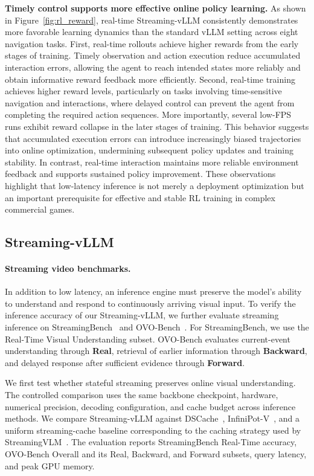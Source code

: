 \textbf{Timely control supports more effective online policy learning.}
As shown in Figure~\ref{fig:rl_reward}, real-time Streaming-vLLM consistently demonstrates more favorable learning dynamics than the standard vLLM setting across eight navigation tasks. First, real-time rollouts achieve higher rewards from the early stages of training. Timely observation and action execution reduce accumulated interaction errors, allowing the agent to reach intended states more reliably and obtain informative reward feedback more efficiently. Second, real-time training achieves higher reward levels, particularly on tasks involving time-sensitive navigation and interactions, where delayed control can prevent the agent from completing the required action sequences. More importantly, several low-FPS runs exhibit reward collapse in the later stages of training. This behavior suggests that accumulated execution errors can introduce increasingly biased trajectories into online optimization, undermining subsequent policy updates and training stability. In contrast, real-time interaction maintains more reliable environment feedback and supports sustained policy improvement. These observations highlight that low-latency inference is not merely a deployment optimization but an important prerequisite for effective and stable RL training in complex commercial games.


\subsection{Streaming-vLLM}
\label{sec:exp_streaming}

\paragraph{Streaming video benchmarks.}
In addition to low latency, an inference engine must preserve the model's ability to understand and respond to continuously arriving visual input.
To verify the inference accuracy of our Streaming-vLLM, we further evaluate streaming inference on StreamingBench~\cite{lin2026streamingbench} and OVO-Bench~\cite{niu2025ovo}.
For StreamingBench, we use the Real-Time Visual Understanding subset.
OVO-Bench evaluates current-event understanding through \textbf{Real}, retrieval of earlier information through \textbf{Backward}, and delayed response after sufficient evidence through \textbf{Forward}.


We first test whether stateful streaming preserves online visual understanding.
The controlled comparison uses the same backbone checkpoint, hardware, numerical precision, decoding configuration, and cache budget across inference methods. We compare Streaming-vLLM against DSCache~\cite{pang2026dscache}, InfiniPot-V~\cite{kim2025infinipotv}, and a uniform streaming-cache baseline corresponding to the caching strategy used by StreamingVLM~\cite{xu2026streamingvlm}.
The evaluation reports StreamingBench Real-Time accuracy, OVO-Bench Overall and its Real, Backward, and Forward subsets, query latency, and peak GPU memory.




